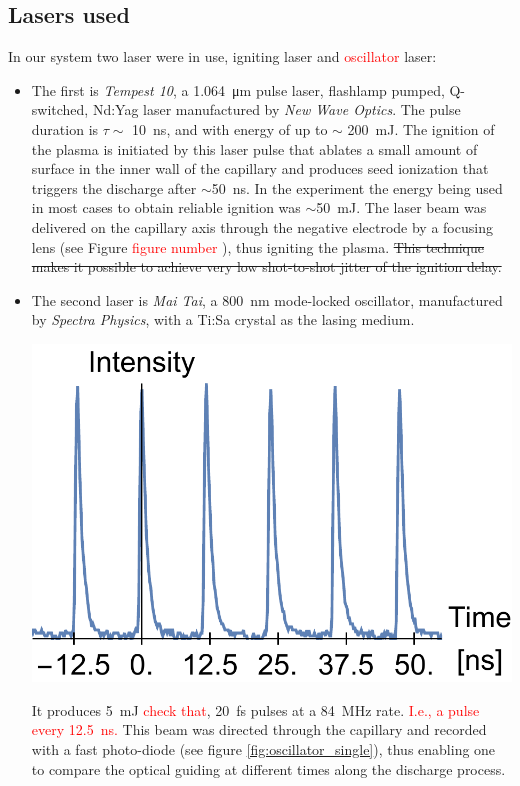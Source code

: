 \documentclass[justified,nofonts,nobib,openany]{tufte-book}
\begin{document}
\subsection{Lasers used}\label{ssec:lasers}
In our system two laser were in use, igniting laser and \textcolor{red}{oscillator} laser:
\begin{itemize}
\item The first is \textit{Tempest 10}, a \SI{1.064}{\um} pulse laser, flashlamp pumped, Q-switched, Nd:Yag laser manufactured by \textit{New Wave Optics}. The pulse duration is $\tau \sim$ \SI{10}{\ns}, and with energy of up to $\sim$ \SI{200}{\mJ}. The ignition of the plasma is initiated by this laser pulse that ablates a small amount of surface in the inner wall of the capillary and produces seed ionization that triggers the discharge after $\sim$\SI{50}{\ns}. In the experiment the energy being used in most cases to obtain reliable ignition was $\sim$\SI{50}{\mJ}. The laser beam was delivered on the capillary axis through the negative electrode by a focusing lens (see Figure \textcolor{red}{figure number }), thus igniting the plasma. \st{This technique makes it possible to achieve very low shot-to-shot jitter of the ignition delay.}
\item The second laser is \textit{Mai Tai}, a \SI{800}{\nm} mode-locked oscillator, manufactured by \textit{Spectra Physics}, with a Ti:Sa crystal as the lasing medium.
\begin{marginfigure}
    \includegraphics[width=\marginparwidth]{figures/oscillator/single.pdf}
    \label{fig:oscillator_single}
    \caption{Oscillator laser, \SI{84}{\MHz} temporal beam profile.}
\end{marginfigure}
It produces \SI{5}{\mJ} \textcolor{red}{check that}, \SI{20}{\fs} pulses at a \SI{84}{\MHz} rate. \textcolor{red}{I.e., a pulse every \SI{12.5}{\ns}.} This beam was directed through the capillary and recorded with a fast photo-diode (see figure \ref{fig:oscillator_single}), thus enabling one to compare the optical guiding at different times along the discharge process.
\end{itemize}
\end{document}
